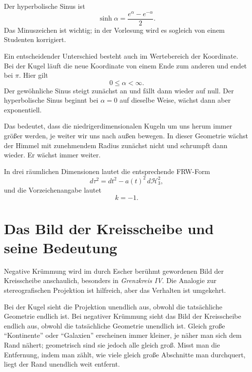 Der hyperbolische Sinus ist
\begin{equation}
\sinh\alpha=\frac{e^\alpha-e^{-\alpha}}{2}.
\end{equation}
Das Minuszeichen ist wichtig; in der Vorlesung wird es sogleich von einem Studenten korrigiert.

Ein entscheidender Unterschied besteht auch im Wertebereich der Koordinate. Bei der Kugel läuft die neue Koordinate von einem Ende zum anderen und endet bei \(\pi\). Hier gilt
\begin{equation}
0\leq \alpha<\infty.
\end{equation}
Der gewöhnliche Sinus steigt zunächst an und fällt dann wieder auf null. Der hyperbolische Sinus beginnt bei \(\alpha=0\) auf dieselbe Weise, wächst dann aber exponentiell.

Das bedeutet, dass die niedrigerdimensionalen Kugeln um uns herum immer größer werden, je weiter wir uns nach außen bewegen. In dieser Geometrie wächst der Himmel mit zunehmendem Radius zunächst nicht und schrumpft dann wieder. Er wächst immer weiter.

In drei räumlichen Dimensionen lautet die entsprechende FRW-Form
\begin{equation}
d\tau^2=dt^2-a(t)^2\,d\mathcal H_3^2,
\end{equation}
und die Vorzeichenangabe lautet
\begin{equation}
k=-1.
\end{equation}

\section{Das Bild der Kreisscheibe und seine Bedeutung}

Negative Krümmung wird im durch Escher berühmt gewordenen Bild der Kreisscheibe anschaulich, besonders in \emph{Grenzkreis IV}. Die Analogie zur stereografischen Projektion ist hilfreich, aber das Verhalten ist umgekehrt.

Bei der Kugel sieht die Projektion unendlich aus, obwohl die tatsächliche Geometrie endlich ist. Bei negativer Krümmung sieht das Bild der Kreisscheibe endlich aus, obwohl die tatsächliche Geometrie unendlich ist. Gleich große ``Kontinente'' oder ``Galaxien'' erscheinen immer kleiner, je näher man sich dem Rand nähert; geometrisch sind sie jedoch alle gleich groß. Misst man die Entfernung, indem man zählt, wie viele gleich große Abschnitte man durchquert, liegt der Rand unendlich weit entfernt.

